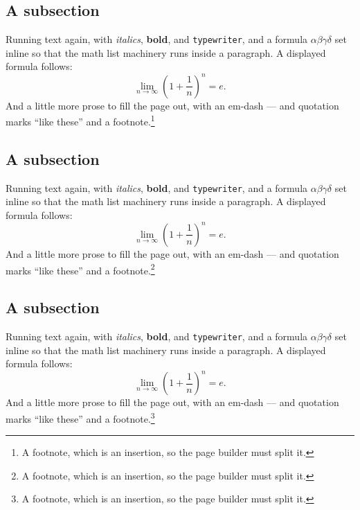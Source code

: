 \documentclass[11pt,a4paper]{report}
\theoremstyle{plain}
\begin{document}
\subsection{A subsection}
Running text again, with \textit{italics}, \textbf{bold}, and
\texttt{typewriter}, and a formula $\alpha\beta\gamma\delta$ set inline so
that the math list machinery runs inside a paragraph. A displayed formula
follows:
\[ \lim_{n\to\infty}\left(1+\frac{1}{n}\right)^{n}=e . \]
And a little more prose to fill the page out, with an em-dash --- and
quotation marks ``like these'' and a footnote.\footnote{A footnote, which is
an insertion, so the page builder must split it.}
\subsection{A subsection}
Running text again, with \textit{italics}, \textbf{bold}, and
\texttt{typewriter}, and a formula $\alpha\beta\gamma\delta$ set inline so
that the math list machinery runs inside a paragraph. A displayed formula
follows:
\[ \lim_{n\to\infty}\left(1+\frac{1}{n}\right)^{n}=e . \]
And a little more prose to fill the page out, with an em-dash --- and
quotation marks ``like these'' and a footnote.\footnote{A footnote, which is
an insertion, so the page builder must split it.}
\subsection{A subsection}
Running text again, with \textit{italics}, \textbf{bold}, and
\texttt{typewriter}, and a formula $\alpha\beta\gamma\delta$ set inline so
that the math list machinery runs inside a paragraph. A displayed formula
follows:
\[ \lim_{n\to\infty}\left(1+\frac{1}{n}\right)^{n}=e . \]
And a little more prose to fill the page out, with an em-dash --- and
quotation marks ``like these'' and a footnote.\footnote{A footnote, which is
an insertion, so the page builder must split it.}
\end{document}

